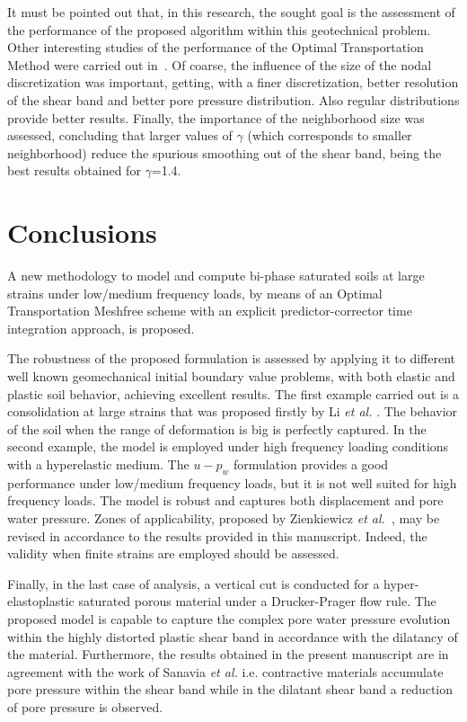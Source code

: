 \documentclass[twocolumn]{svjour3}          %
\begin{document}
It must be pointed out that, in this research, the sought goal is the assessment of the performance of the proposed algorithm within this geotechnical problem. Other interesting studies of the performance of the Optimal Transportation Method were carried out in~\cite{Navas:17b}. Of coarse, the influence of the size of the nodal discretization was important, getting, with a finer discretization, better resolution of the shear band and better pore pressure distribution. Also regular distributions provide better results. Finally, the importance of the neighborhood size was assessed, concluding that larger values of $\gamma$ (which corresponds to smaller neighborhood) reduce the spurious smoothing out of the shear band, being the best results obtained for $\gamma$=1.4.

\section{Conclusions}
\label{sec:6}
A new methodology to model and compute bi-phase saturated soils at large strains under low/medium frequency loads, by means of an Optimal Transportation Meshfree scheme with an explicit predictor-corrector time integration approach, is proposed.

The robustness of the proposed formulation is assessed by applying it to different well known geomechanical initial boundary value problems, with both elastic and plastic soil behavior, achieving excellent results. The first example carried out is a consolidation at large strains that was proposed firstly by Li \textit{et al.} \cite{LiBorja2004}. The behavior of the soil when the range of deformation is big is perfectly captured. In the second example, the model is employed under high frequency loading conditions with a hyperelastic medium. The $u-p_w$ formulation provides a good performance under low/medium frequency loads, but it is not well suited for high frequency loads. The model is robust and captures both displacement and pore water pressure. Zones of applicability, proposed by Zienkiewicz \textit{et al.}~\cite{zienkiewicz1980}, may be revised in accordance to the results provided in this manuscript. Indeed, the validity when finite strains are employed should be assessed.

Finally, in the last case of analysis, a vertical cut is conducted for a hyper-elastoplastic saturated porous material under a Drucker-Prager flow rule. The proposed model is capable to capture the complex pore water pressure evolution within the highly distorted plastic shear band in accordance with the dilatancy of the  material. Furthermore, the results obtained in the present manuscript are in agreement with the work of Sanavia \textit{et al.}\cite{Sanavia:02b} i.e. contractive materials accumulate pore pressure within the shear band  while  in  the  dilatant  shear  band  a  reduction of pore pressure is observed.
\end{document}
